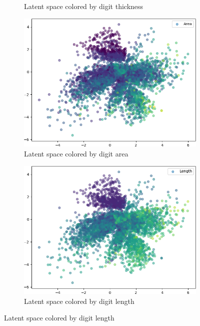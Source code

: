 \documentclass[11pt,a4paper]{article}
\begin{document}
\begin{figure}[H]
\begin{subfigure}{.32\textwidth}
\caption{Latent space colored by digit thickness}
\label{subfig:vae_mnist_latent_space_thickness}
\end{subfigure}
\hfill
\begin{subfigure}{.32\textwidth}
\includegraphics[width=\textwidth]{images/latent_spaces/mnist/vae_gan/embeddings_mu_2.png}
\caption{Latent space colored by digit area}
\label{subfig:vae_mnist_latent_space_area}
\end{subfigure}
\hfill
\begin{subfigure}{.24\textwidth}
\includegraphics[width=\textwidth]{images/latent_spaces/mnist/vae_gan/embeddings_mu_3.png}
\caption{Latent space colored by digit length}
\label{subfig:vae_mnist_latent_space_length}
\end{subfigure}

\end{figure}
\end{document}
